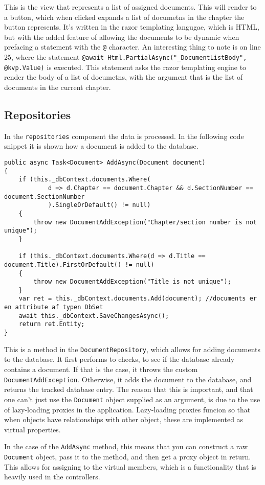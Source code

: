 This is the view that represents a list of assigned documents. This will render to a button, which when clicked expands a list of documetns in the chapter the button represents.
It's written in the razor templating langugae, which is HTML, but with the added feature of allowing the documents to be dynamic when prefacing a statement with the \texttt{@} character.
An interesting thing to note is on line 25, where the statement \texttt{@await Html.PartialAsync("_DocumentListBody", @kvp.Value)} is executed.
This statement asks the razor templating engine to render the body of a list of documetns, with the argument that is the list of documents in the current chapter.

\subsection{Repositories}

In the \texttt{repositories} component the data is processed.
In the following code snippet it is shown how a document is added to the database.
\\
\begin{lstlisting}[caption={Document repository: AddAsync}, label={lst:docrepadd}]
public async Task<Document> AddAsync(Document document)
{
	if (this._dbContext.documents.Where(
			d => d.Chapter == document.Chapter && d.SectionNumber == document.SectionNumber
			).SingleOrDefault() != null)
	{
		throw new DocumentAddException("Chapter/section number is not unique");
	}

	if (this._dbContext.documents.Where(d => d.Title == document.Title).FirstOrDefault() != null)
	{
		throw new DocumentAddException("Title is not unique");
	}
	var ret = this._dbContext.documents.Add(document); //documents er en attribute af typen DbSet
	await this._dbContext.SaveChangesAsync();
	return ret.Entity;
}
\end{lstlisting}
This is a method in the \texttt{DocumentRepository}, which allows for adding documents to the database.
It first performs to checks, to see if the database already contains a document.
If that is the case, it throws the custom \texttt{DocumentAddException}.
Otherwise, it adds the document to the database, and returns the tracked database entry.
The reason that this is important, and that one can't just use the \texttt{Document} object supplied as an argument, is due to the use of lazy-loading proxies in the application.
Lazy-loading proxies funcion so that when objects have relationships with other object, these are implemented as virtual properties.


In the case of the \texttt{AddAsync} method, this means that you can construct a raw \texttt{Document} object, pass it to the method, and then get a proxy object in return.
This allows for assigning to the virtual members, which is a functionality that is heavily used in the controllers.

